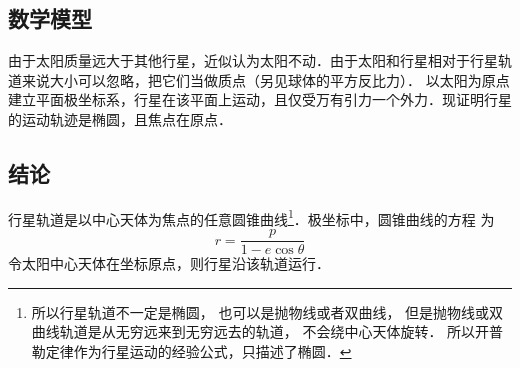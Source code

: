 

\subsection{数学模型}
由于太阳质量远大于其他行星，近似认为太阳不动．由于太阳和行星相对于行星轨道来说大小可以忽略，把它们当做质点（另见球体的平方反比力）．%
以太阳为原点建立平面极坐标系，行星在该平面上运动，且仅受万有引力一个外力．现证明行星的运动轨迹是椭圆，且焦点在原点．

\subsection{结论}
行星轨道是以中心天体为焦点的任意圆锥曲线\footnote{所以行星轨道不一定是椭圆， 也可以是抛物线或者双曲线， 但是抛物线或双曲线轨道是从无穷远来到无穷远去的轨道， 不会绕中心天体旋转． 所以开普勒定律作为行星运动的经验公式，只描述了椭圆．}．极坐标中，圆锥曲线的方程
为
\begin{equation}\label{Keple1_eq1}
r = \frac{p}{1 - e \cos \theta }
\end{equation}
令太阳中心天体在坐标原点，则行星沿该轨道运行．


